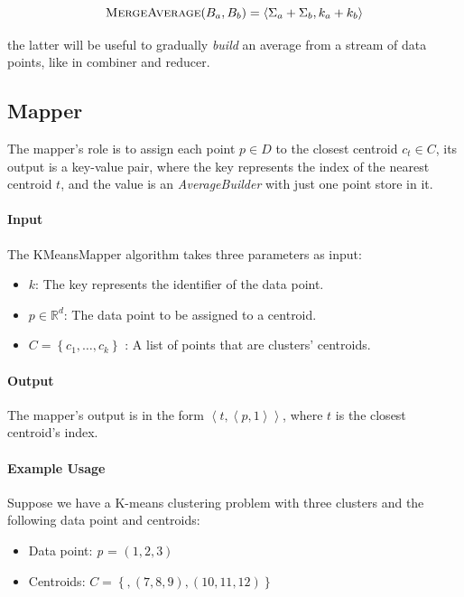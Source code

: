 \documentclass[parskip=full]{report}
\begin{document}
\begin{equation}
\label{mergeAvg}
\text{\textsc{MergeAverage}}(B_a, B_b) =
\left\langle \Sigma_a + \Sigma_b, k_a + k_b\right\rangle
\end{equation}

the latter will be useful to gradually \textit{build} an average from a stream 
of 
data points, like in combiner and reducer.

\subsection{Mapper}
The mapper's role is to assign each point $p \in D$ to the closest centroid 
$c_t \in C$, its output is a key-value pair, where the key represents the 
index of the nearest centroid $t$, and the value is an \emph{AverageBuilder} 
with just one point store in it.

\paragraph{Input}
The KMeansMapper algorithm takes three parameters as input:

\begin{itemize}
	\item $k$: The key represents the identifier of the data point.
	\item $p \in \mathbb{R}^d$: The data point to be assigned to a centroid.
	\item $C = \left\{c_1, \dots, c_k\right\}$ : A list of points that are 
	clusters' centroids.
\end{itemize}

\paragraph{Output}
The mapper's output is in the form $\left\langle t, \left\langle 
p,1\right\rangle \right\rangle$, where $t$ is the closest centroid's index.

\paragraph{Example Usage}
Suppose we have a K-means clustering problem with three clusters and the following data point and centroids:

\begin{itemize}
	\item	Data point: \textit{p} = $(1, 2, 3)$
	
	\item Centroids: $C =\left\{, (7, 8, 9), (10, 11, 12)\right\} $
\end{itemize}
\end{document}
